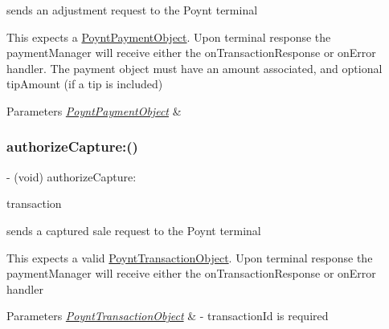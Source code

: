 sends an adjustment request to the Poynt terminal 

This expects a \hyperlink{interface_poynt_payment_object}{Poynt\+Payment\+Object}. Upon terminal response the payment\+Manager will receive either the on\+Transaction\+Response or on\+Error handler. The payment object must have an amount associated, and optional tip\+Amount (if a tip is included)


\begin{DoxyParams}{Parameters}
{\em \hyperlink{interface_poynt_payment_object}{Poynt\+Payment\+Object}} & \\
\hline
\end{DoxyParams}
\hypertarget{interface_poynt_p_o_s_connection_manager_aa35b8ab75b2115f27c8363465b2f4c85}{}\label{interface_poynt_p_o_s_connection_manager_aa35b8ab75b2115f27c8363465b2f4c85} 
\subsubsection{\texorpdfstring{authorize\+Capture\+:()}{authorizeCapture:()}}
{\footnotesize\ttfamily -\/ (void) authorize\+Capture\+: \begin{DoxyParamCaption}\item[{(\hyperlink{interface_poynt_transaction_object}{Poynt\+Transaction\+Object} $\ast$)}]{transaction }\end{DoxyParamCaption}}



sends a captured sale request to the Poynt terminal 

This expects a valid \hyperlink{interface_poynt_transaction_object}{Poynt\+Transaction\+Object}. Upon terminal response the payment\+Manager will receive either the on\+Transaction\+Response or on\+Error handler


\begin{DoxyParams}{Parameters}
{\em \hyperlink{interface_poynt_transaction_object}{Poynt\+Transaction\+Object}} & -\/ transaction\+Id is required \\
\hline
\end{DoxyParams}
\hypertarget{interface_poynt_p_o_s_connection_manager_a80bcfbd9a0d3d99af46027edee12d5ba}{}\label{interface_poynt_p_o_s_connection_manager_a80bcfbd9a0d3d99af46027edee12d5ba} 
